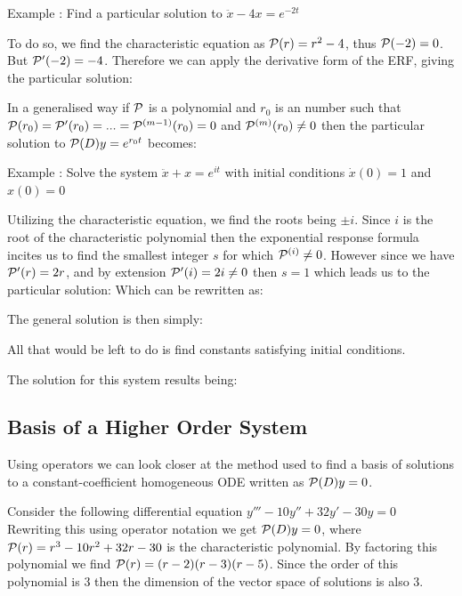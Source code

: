 \documentclass[11pt, openright]{book}
\begin{document}
\begin{dent}{Example :}
    Find a particular solution to $\ddot{x}-4x=e^{-2t}$

    To do so, we find the characteristic equation as $\P(r)=r^2-4$, thus $\P(-2)=0$. But $\P'(-2)=-4$. Therefore we can apply the derivative form of the ERF, giving the particular solution:
\end{dent}

In a generalised way if $\P$ is a polynomial and $r_0$ is an number such that $\P(r_0)=\P'(r_0)=...=\P^{(m-1)}(r_0)=0$ and $\P^{(m)}(r_0)\neq0$
then the particular solution to $\P(D)y=e^{r_0t}$ becomes:



\begin{dent}{Example :}
    Solve the system $\ddot{x}+x=e^{it}$ with initial conditions $\dot{x}(0)=1$ and $x(0)=0$

    Utilizing the characteristic equation, we find the roots being $\pm i$. Since $i$ is the root of the characteristic polynomial then the exponential response formula incites us to find the smallest integer $s$ for which $\P^{(i)}\neq 0$. However since we have $\P'(r)=2r$, and by extension $\P'(i)=2i\neq 0$ then $s=1$ which leads us to the particular solution:
    Which can be rewritten as:

    The general solution is then simply:

    All that would be left to do is find constants satisfying initial conditions.

    The solution for this system results being:
\end{dent}

\subsection{Basis of a Higher Order System}

Using operators we can look closer at the method used to find a basis of solutions to a constant-coefficient homogeneous ODE written as $\P(D)y=0$.

Consider the following differential equation $y'''-10y''+32y'-30y=0$\\
Rewriting this using operator notation we get $\P(D)y=0$, where $\P(r)=r^3-10r^2+32r-30$ is the characteristic polynomial. By factoring this polynomial we find $\P(r)=(r-2)(r-3)(r-5)$. Since the order of this polynomial is $3$ then the dimension of the vector space of solutions is also $3$.\vspace{-25pt}
\end{document}
